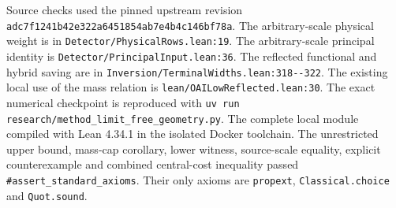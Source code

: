 \documentclass[11pt]{article}
\begin{document}
Source checks used the pinned upstream revision
\nolinkurl{adc7f1241b42e322a6451854ab7e4b4c146bf78a}.
The arbitrary-scale physical weight is in
\nolinkurl{Detector/PhysicalRows.lean:19}.
The arbitrary-scale principal identity is
\nolinkurl{Detector/PrincipalInput.lean:36}.
The reflected functional and hybrid saving are in
\nolinkurl{Inversion/TerminalWidths.lean:318--322}.
The existing local use of the mass relation is
\nolinkurl{lean/OAILowReflected.lean:30}.
The exact numerical checkpoint is reproduced with
\texttt{uv run} \nolinkurl{research/method_limit_free_geometry.py}.
The complete local module compiled with Lean 4.34.1 in the isolated
Docker toolchain.  The unrestricted upper bound, mass-cap corollary,
lower witness, source-scale equality, explicit counterexample and
combined central-cost inequality passed
\texttt{\#assert\_standard\_axioms}.  Their only axioms are
\texttt{propext}, \texttt{Classical.choice} and \texttt{Quot.sound}.
\end{document}
